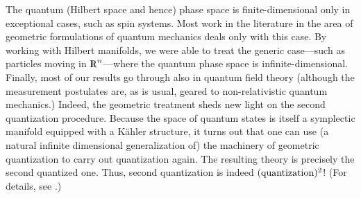 The quantum (Hilbert space and hence) phase space is
finite-dimensional only in exceptional cases, such as spin
systems. Most work in the literature in the area of geometric
formulations of quantum mechanics deals only with this case.  By
working with Hilbert manifolds, we were able to treat the generic
case---such as particles moving in $\R^n$---where the quantum phase
space is infinite-dimensional. Finally, most of our results go through
also in quantum field theory (although the measurement postulates are,
as is usual, geared to non-relativistic quantum mechanics.) Indeed,
the geometric treatment sheds new light on the second quantization
procedure. Because the space of quantum states is itself a symplectic
manifold equipped with a K\"ahler structure, it turns out that one can
use (a natural infinite dimensional generalization of) the machinery
of geometric quantization to carry out quantization again. The
resulting theory is precisely the second quantized one. Thus, second
quantization is indeed $({\rm quantization})^2$!  (For details, see
\cite{thesis}.)

